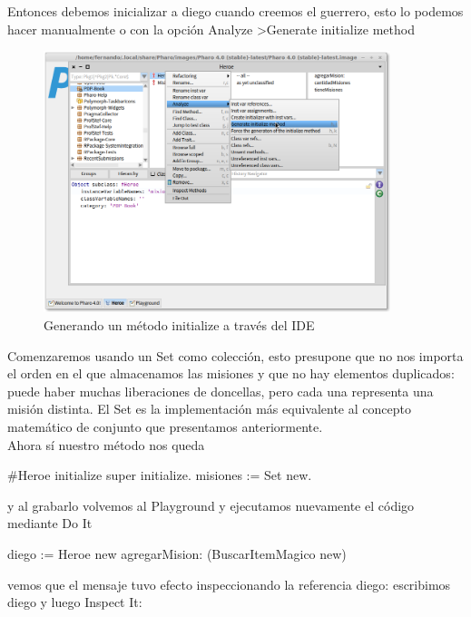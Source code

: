 \documentclass[a4paper,12pt]{book}
\begin{document}
Entonces debemos inicializar a diego cuando creemos el guerrero, esto lo podemos hacer manualmente o con la opción
Analyze \textgreater Generate initialize method

\begin{figure}[h!]
    \centering	
    \includegraphics[width=0.9\textwidth]{images/13_generate_initialize.png}
    \caption{Generando un método initialize a través del IDE}
\end{figure}
\FloatBarrier

Comenzaremos usando un Set como colección, esto presupone que no nos importa el orden en el que almacenamos las
misiones y que no hay elementos duplicados: puede haber muchas liberaciones de doncellas, pero cada una 
representa una misión distinta. El Set es la implementación más equivalente al concepto matemático de conjunto
que presentamos anteriormente.
\\
Ahora sí nuestro método nos queda

\begin{code}
#Heroe
initialize
	super initialize.
	misiones := Set new.
\end{code}

y al grabarlo volvemos al Playground y ejecutamos nuevamente el código mediante Do It

\begin{code}
diego := Heroe new
  agregarMision: (BuscarItemMagico new)
\end{code}

vemos que el mensaje tuvo efecto inspeccionando la referencia diego: escribimos diego y luego Inspect It:
\end{document}
